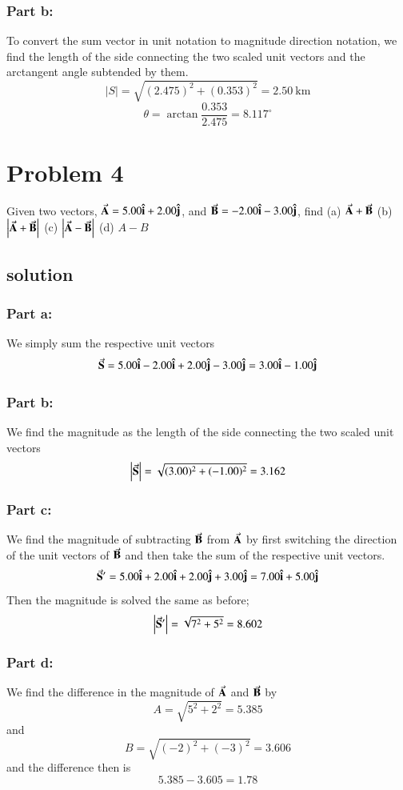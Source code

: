 \documentclass{article}
\begin{document}
\subsubsection*{Part b:}
To convert the sum vector in unit notation to magnitude direction notation, we find the length of the side connecting the two scaled unit vectors and the arctangent angle subtended by them.
\[
	|S| = \sqrt{(2.475)^2 + (0.353)^2} = 2.50\ \text{km}
\]
\[
	\theta = \arctan \frac{0.353}{2.475} = 8.117^\circ
\]

\section*{Problem 4}
Given two vectors, $\va A  = 5.00 \vu i + 2.00 \vu j$, and $\va B = -2.00 \vu i - 3.00 \vu j$, find
(a) $\va A + \va B$
(b) $\left|\va A + \va B\right|$
(c) $\left|\va A - \va B\right|$
(d) $A - B$

\subsection*{solution}
\subsubsection*{Part a:}
We simply sum the respective unit vectors
\[
	\va S = 5.00 \vu i - 2.00 \vu i + 2.00 \vu j - 3.00 \vu j = 3.00 \vu i - 1.00 \vu j
\]
\subsubsection*{Part b:}
We find the magnitude as the length of the side connecting the two scaled unit vectors
\[
	\left|\va S\right| = \sqrt{(3.00)^2 + (-1.00)^2} = 3.162
\]

\subsubsection*{Part c:}
We find the magnitude of subtracting $\va B$ from $\va A$ by first switching the direction of the unit vectors of $\va B$ and then take the sum of the respective unit vectors.
\[
	\va S^\prime = 5.00 \vu i + 2.00 \vu i + 2.00 \vu j + 3.00 \vu j = 7.00 \vu i + 5.00 \vu j
\]
Then the magnitude is solved the same as before;
\[
	\left|\va S^\prime\right| = \sqrt{7^2 + 5^2} = 8.602
\]

\subsubsection*{Part d:}
We find the difference in the magnitude of $\va A$ and $\va B$ by
\[
	A = \sqrt{5^2 + 2^2} = 5.385
\]
and
\[
	B = \sqrt{(-2)^2 + (-3)^2} = 3.606
\]
and the difference then is
\[
	5.385 - 3.605 = 1.78
\]
\end{document}
